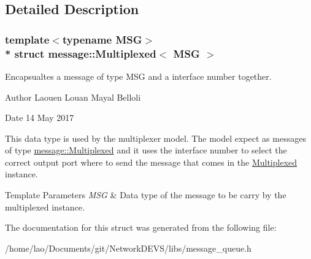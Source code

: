 \subsection{Detailed Description}
\subsubsection*{template$<$typename M\+SG$>$\\*
struct message\+::\+Multiplexed$<$ M\+S\+G $>$}

Encapsualtes a message of type M\+SG and a interface number together. 

\begin{DoxyAuthor}{Author}
Laouen Louan Mayal Belloli 
\end{DoxyAuthor}
\begin{DoxyDate}{Date}
14 May 2017
\end{DoxyDate}
This data type is used by the multiplexer model. The model expect as messages of type \hyperlink{structmessage_1_1Multiplexed}{message\+::\+Multiplexed} and it uses the interface number to select the correct output port where to send the message that comes in the \hyperlink{structmessage_1_1Multiplexed}{Multiplexed} instance.


\begin{DoxyTemplParams}{Template Parameters}
{\em M\+SG} & Data type of the message to be carry by the multiplexed instance. \\
\hline
\end{DoxyTemplParams}


The documentation for this struct was generated from the following file\+:\begin{DoxyCompactItemize}
\item 
/home/lao/\+Documents/git/\+Network\+D\+E\+V\+S/libs/message\+\_\+queue.\+h\end{DoxyCompactItemize}
